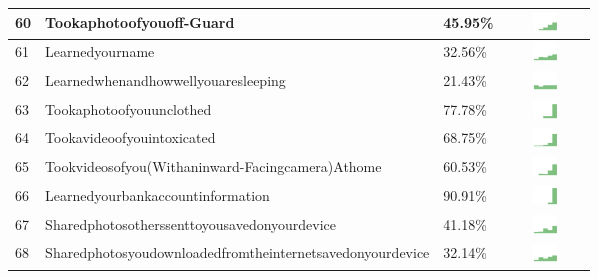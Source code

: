 \begin{table}[t]
\begin{center}
\begin{tabular}{| p{0.5cm} | p{7cm} | p{1cm} | c |}
60 & Tookaphotoofyouoff-Guard & 45.95\% & \includegraphics[width = 2cm, height = 0.5cm]{../tookaphotoofyouoff-guardAPPSERVER} \\ \hline 
61 & Learnedyourname & 32.56\% & \includegraphics[width = 2cm, height = 0.5cm]{../learnedyournameAPPSERVER} \\ \hline 
62 & Learnedwhenandhowwellyouaresleeping & 21.43\% & \includegraphics[width = 2cm, height = 0.5cm]{../learnedwhenandhowwellyouaresleepingAPPSERVER} \\ \hline 
63 & Tookaphotoofyouunclothed & 77.78\% & \includegraphics[width = 2cm, height = 0.5cm]{../tookaphotoofyouunclothedAPPSERVER} \\ \hline 
64 & Tookavideoofyouintoxicated & 68.75\% & \includegraphics[width = 2cm, height = 0.5cm]{../tookavideoofyouintoxicatedAPPSERVER} \\ \hline 
65 & Tookvideosofyou(Withaninward-Facingcamera)Athome & 60.53\% & \includegraphics[width = 2cm, height = 0.5cm]{../tookvideosofyou(withaninward-facingcamera)athomeAPPSERVER} \\ \hline 
66 & Learnedyourbankaccountinformation & 90.91\% & \includegraphics[width = 2cm, height = 0.5cm]{../learnedyourbankaccountinformationAPPSERVER} \\ \hline 
67 & Sharedphotosotherssenttoyousavedonyourdevice & 41.18\% & \includegraphics[width = 2cm, height = 0.5cm]{../sharedphotosotherssenttoyousavedonyourdeviceAPPSERVER} \\ \hline 
68 & Sharedphotosyoudownloadedfromtheinternetsavedonyourdevice & 32.14\% & \includegraphics[width = 2cm, height = 0.5cm]{../sharedphotosyoudownloadedfromtheinternetsavedonyourdeviceAPPSERVER} \\ \hline 

\end{tabular}
\end{center}
\end{table}
